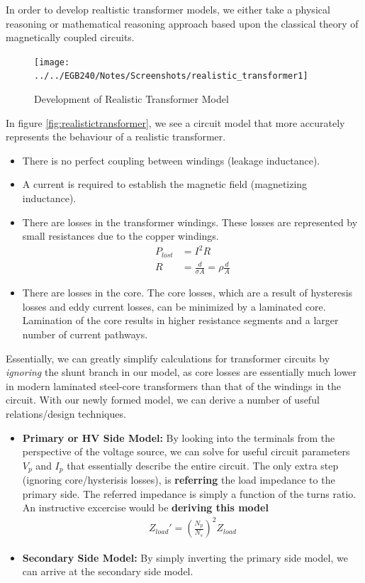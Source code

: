 \documentclass{book}
\begin{document}
In order to develop realtistic transformer models, we either take a physical reasoning or mathematical reasoning approach based upon the classical theory of magnetically coupled circuits.

\begin{figure}[h]
	\centering
	\texttt{[image: ../../EGB240/Notes/Screenshots/realistic\_transformer1]}
	\caption{Development of Realistic Transformer Model}
	\label{fig:realistictransformer1}
\end{figure}

In figure \ref{fig:realistictransformer}, we see a circuit model that more accurately represents the behaviour of a realistic transformer. 

\begin{itemize}
	\item There is no perfect coupling between windings (leakage inductance).
	\item A current is required to establish the magnetic field (magnetizing inductance).
	\item There are losses in the transformer windings. These losses are represented by small resistances due to the copper windings. 
	\begin{align*}
		P_{lost} &= I^2 R \\
		R &= \frac{d}{\sigma A} = \rho \frac{d}{A} 
	\end{align*}
	\item There are losses in the core. The core losses, which are a result of hysteresis losses and eddy current losses, can be minimized by a laminated core. Lamination of the core results in higher resistance segments and a larger number of current pathways.
\end{itemize}

Essentially, we can greatly simplify calculations for transformer circuits by \textit{ignoring} the shunt branch in our model, as core losses are essentially much lower in modern laminated steel-core transformers than that of the windings in the circuit. With our newly formed model, we can derive a number of useful relations/design techniques.

\begin{itemize}
	\item \textbf{Primary or HV Side Model:} By looking into the terminals from the perspective of the voltage source, we can solve for useful circuit parameters $V_p$ and $I_p$ that essentially describe the entire circuit. The only extra step (ignoring core/hysterisis losses), is \textbf{referring} the load impedance to the primary side. The referred impedance is simply a function of the turns ratio. An instructive excercise would be \textbf{deriving this model}
	\begin{align*}
		Z_{load}' = (\frac{N_p}{N_s})^2 Z_{load} 
	\end{align*}
	\item \textbf{Secondary Side Model:} By simply inverting the primary side model, we can arrive at the secondary side model.
\end{itemize}
\end{document}
